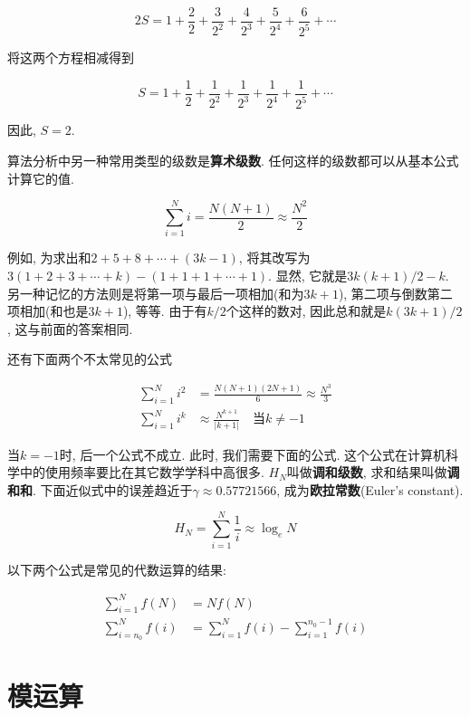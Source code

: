 \documentclass[oneside,10pt,fontset=none]{ctexbook}
\numberwithin{definition}{chapter}
\numberwithin{theorem}{chapter}
\numberwithin{proof}{chapter}
\begin{document}
$$
2S=1+\frac{2}{2}+\frac{3}{2^2}+\frac{4}{2^3}+\frac{5}{2^4}+\frac{6}{2^5}+\cdots
$$

将这两个方程相减得到

$$
S=1+\frac{1}{2}+\frac{1}{2^2}+\frac{1}{2^3}+\frac{1}{2^4}+\frac{1}{2^5}+\cdots
$$

因此, $S=2$.

算法分析中另一种常用类型的级数是\textbf{算术级数}. 任何这样的级数都可以从基本公式计算它的值.

$$
\sum_{i=1}^{N}i=\frac{N(N+1)}{2}\approx\frac{N^2}{2}
$$

例如, 为求出和$2+5+8+\cdots+(3k-1)$, 将其改写为$3(1+2+3+\cdots+k)-(1+1+1+\cdots+1)$. 显然, 它就是$3k(k+1)/2-k$. 另一种记忆的方法则是将第一项与最后一项相加(和为$3k+1$), 第二项与倒数第二项相加(和也是$3k+1$), 等等. 由于有$k/2$个这样的数对, 因此总和就是$k(3k+1)/2$, 这与前面的答案相同.

还有下面两个不太常见的公式

\begin{equation*}
    \begin{split}
        \sum_{i=1}^{N}i^2 &= \frac{N(N+1)(2N+1)}{6}\approx\frac{N^3}{3} \\
        \sum_{i=1}^{N}i^k &\approx\frac{N^{k+1}}{|k+1|}\quad\text{当}k\ne -1 
    \end{split}
\end{equation*}

当$k=-1$时, 后一个公式不成立. 此时, 我们需要下面的公式. 这个公式在计算机科学中的使用频率要比在其它数学学科中高很多. $H_N$叫做\textbf{调和级数}, 求和结果叫做\textbf{调和和}. 下面近似式中的误差趋近于$\gamma\approx 0.57721566$, 成为\textbf{欧拉常数}(Euler's constant).

$$
H_N=\sum_{i=1}^{N}\frac{1}{i}\approx\log_eN
$$

以下两个公式是常见的代数运算的结果:

\begin{equation*}
    \begin{split}
        \sum_{i=1}^{N}f(N) &= Nf(N) \\
        \sum_{i=n_0}^{N}f(i) &= \sum_{i=1}^{N}f(i) - \sum_{i=1}^{n_0-1}f(i)
    \end{split}
\end{equation*}

\section{模运算}

\newcommand{\Mod}[1]{\ (\mathrm{mod}\ #1)}
\end{document}
